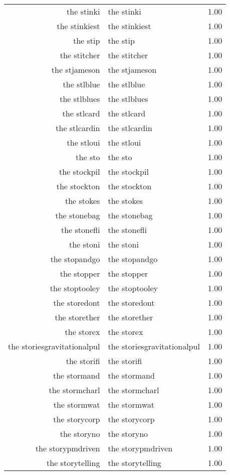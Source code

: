 \begin{table}[ht]
\begin{tabular}{rlr}
  the stinki & the stinki & 1.00 \\ 
  the stinkiest & the stinkiest & 1.00 \\ 
  the stip & the stip & 1.00 \\ 
  the stitcher & the stitcher & 1.00 \\ 
  the stjameson & the stjameson & 1.00 \\ 
  the stlblue & the stlblue & 1.00 \\ 
  the stlblues & the stlblues & 1.00 \\ 
  the stlcard & the stlcard & 1.00 \\ 
  the stlcardin & the stlcardin & 1.00 \\ 
  the stloui & the stloui & 1.00 \\ 
  the sto & the sto & 1.00 \\ 
  the stockpil & the stockpil & 1.00 \\ 
  the stockton & the stockton & 1.00 \\ 
  the stokes & the stokes & 1.00 \\ 
  the stonebag & the stonebag & 1.00 \\ 
  the stonefli & the stonefli & 1.00 \\ 
  the stoni & the stoni & 1.00 \\ 
  the stopandgo & the stopandgo & 1.00 \\ 
  the stopper & the stopper & 1.00 \\ 
  the stoptooley & the stoptooley & 1.00 \\ 
  the storedont & the storedont & 1.00 \\ 
  the storether & the storether & 1.00 \\ 
  the storex & the storex & 1.00 \\ 
  the storiesgravitationalpul & the storiesgravitationalpul & 1.00 \\ 
  the storifi & the storifi & 1.00 \\ 
  the stormand & the stormand & 1.00 \\ 
  the stormcharl & the stormcharl & 1.00 \\ 
  the stormwat & the stormwat & 1.00 \\ 
  the storycorp & the storycorp & 1.00 \\ 
  the storyno & the storyno & 1.00 \\ 
  the storypmdriven & the storypmdriven & 1.00 \\ 
  the storytelling & the storytelling & 1.00 \\ 

\end{tabular}
\end{table}
